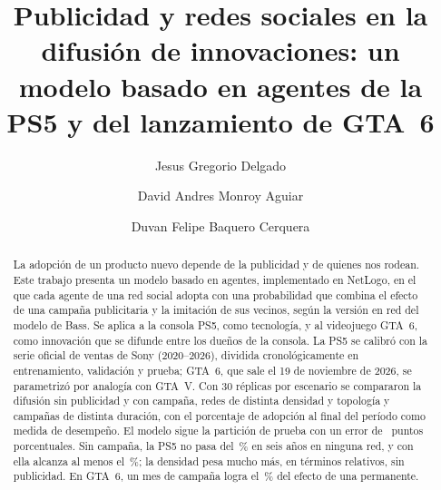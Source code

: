 \documentclass[runningheads]{llncs}
\begin{document}
\title{Publicidad y redes sociales en la difusión de innovaciones: un modelo basado en agentes de la PS5 y del lanzamiento de GTA~6}

\author{Jesus Gregorio Delgado \and David Andres Monroy Aguiar \and Duvan Felipe Baquero Cerquera}


\maketitle

\begin{abstract}
La adopción de un producto nuevo depende de la publicidad y de quienes nos rodean. Este trabajo presenta un modelo basado en agentes, implementado en NetLogo, en el que cada agente de una red social adopta con una probabilidad que combina el efecto de una campaña publicitaria y la imitación de sus vecinos, según la versión en red del modelo de Bass. Se aplica a la consola PS5, como tecnología, y al videojuego GTA~6, como innovación que se difunde entre los dueños de la consola. La PS5 se calibró con la serie oficial de ventas de Sony (2020--2026), dividida cronológicamente en entrenamiento, validación y prueba; GTA~6, que sale el 19 de noviembre de 2026, se parametrizó por analogía con GTA~V. Con 30 réplicas por escenario se compararon la difusión sin publicidad y con campaña, redes de distinta densidad y topología y campañas de distinta duración, con el porcentaje de adopción al final del período como medida de desempeño. El modelo sigue la partición de prueba con un error de \cifraAbmRmsePru\ puntos porcentuales. Sin campaña, la PS5 no pasa del \cifraPsSinMaxGlobal\,\% en seis años en ninguna red, y con ella alcanza al menos el \cifraPsConMin\,\%; la densidad pesa mucho más, en términos relativos, sin publicidad. En GTA~6, un mes de campaña logra el \cifraFraccionGtaDUno\,\% del efecto de una permanente.

\end{abstract}
\end{document}
